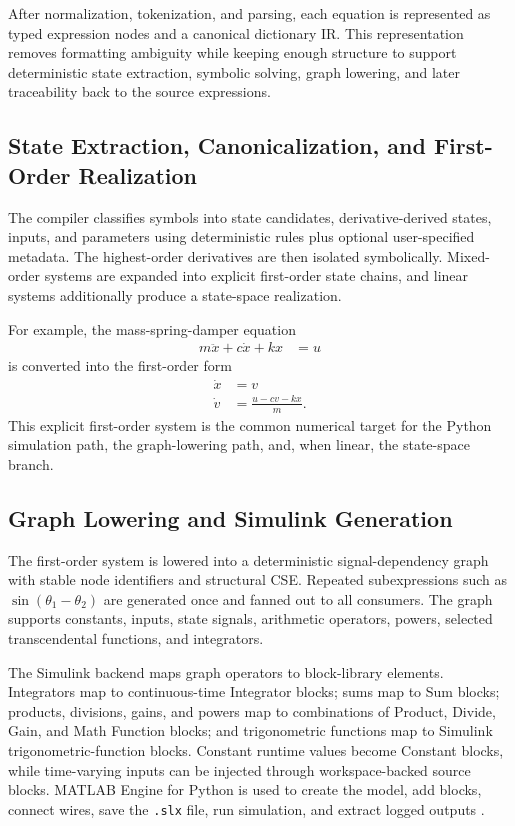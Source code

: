 \documentclass[colorlinks,upint,subscriptcorrection,varvw,balance,nofoot]{asmeconf}
\begin{document}
After normalization, tokenization, and parsing, each equation is represented as typed expression nodes and a canonical dictionary IR. This representation removes formatting ambiguity while keeping enough structure to support deterministic state extraction, symbolic solving, graph lowering, and later traceability back to the source expressions.

\subsection{State Extraction, Canonicalization, and First-Order Realization}
The compiler classifies symbols into state candidates, derivative-derived states, inputs, and parameters using deterministic rules plus optional user-specified metadata. The highest-order derivatives are then isolated symbolically. Mixed-order systems are expanded into explicit first-order state chains, and linear systems additionally produce a state-space realization.

For example, the mass-spring-damper equation
\begin{align}
  m\ddot{x} + c\dot{x} + kx &= u
\end{align}
is converted into the first-order form
\begin{align}
  \dot{x} &= v \\
  \dot{v} &= \frac{u - cv - kx}{m}.
  \label{eq:massspring_first_order}
\end{align}
This explicit first-order system is the common numerical target for the Python simulation path, the graph-lowering path, and, when linear, the state-space branch.

\subsection{Graph Lowering and Simulink Generation}
The first-order system is lowered into a deterministic signal-dependency graph with stable node identifiers and structural CSE. Repeated subexpressions such as $\sin(\theta_1-\theta_2)$ are generated once and fanned out to all consumers. The graph supports constants, inputs, state signals, arithmetic operators, powers, selected transcendental functions, and integrators.

The Simulink backend maps graph operators to block-library elements. Integrators map to continuous-time Integrator blocks; sums map to Sum blocks; products, divisions, gains, and powers map to combinations of Product, Divide, Gain, and Math Function blocks; and trigonometric functions map to Simulink trigonometric-function blocks. Constant runtime values become Constant blocks, while time-varying inputs can be injected through workspace-backed source blocks. MATLAB Engine for Python is used to create the model, add blocks, connect wires, save the \texttt{.slx} file, run simulation, and extract logged outputs \cite{mathworks2025python}.
\end{document}
